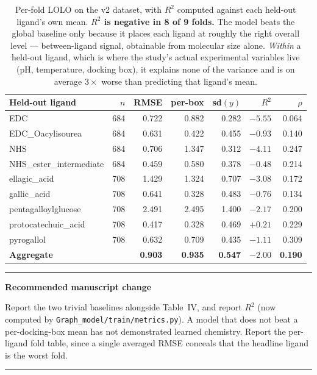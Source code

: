 \documentclass[11pt,a4paper]{article}
\newcommand{\ok}[1]{\textcolor{okgreen}{#1}}
\newcommand{\bad}[1]{\textcolor{badred}{#1}}
\newcommand{\code}[1]{\texttt{\small #1}}
\newenvironment{callout}[1]{%
  \par\medskip\noindent
  \begin{minipage}{\linewidth}%
  \rule{\linewidth}{1.2pt}\par\smallskip
  \textbf{#1}\par\smallskip
}{%
  \par\smallskip\rule{\linewidth}{0.6pt}%
  \end{minipage}\par\medskip
}
\begin{document}
\begin{table}[h]\centering
\small
\begin{tabular}{@{}lrrrrrr@{}}
\toprule
\textbf{Held-out ligand} & \textbf{$n$} & \textbf{RMSE} &
\textbf{per-box} & \textbf{sd$(y)$} & \textbf{$R^2$} & \textbf{$\rho$} \\
\midrule
EDC                     & 684 & 0.722 & 0.882 & 0.282 & \bad{$-5.55$} & 0.064 \\
EDC\_Oacylisourea       & 684 & 0.631 & 0.422 & 0.455 & \bad{$-0.93$} & 0.140 \\
NHS                     & 684 & 0.706 & 1.347 & 0.312 & \bad{$-4.11$} & 0.247 \\
NHS\_ester\_intermediate& 684 & 0.459 & 0.580 & 0.378 & \bad{$-0.48$} & 0.214 \\
ellagic\_acid           & 708 & 1.429 & 1.324 & 0.707 & \bad{$-3.08$} & 0.172 \\
gallic\_acid            & 708 & 0.641 & 0.328 & 0.483 & \bad{$-0.76$} & 0.134 \\
pentagalloylglucose     & 708 & 2.491 & 2.495 & 1.400 & \bad{$-2.17$} & 0.200 \\
protocatechuic\_acid    & 708 & 0.417 & 0.328 & 0.469 & \ok{$+0.21$}  & 0.229 \\
pyrogallol              & 708 & 0.632 & 0.709 & 0.435 & \bad{$-1.11$} & 0.309 \\
\midrule
\textbf{Aggregate}      &     & \textbf{0.903} & \textbf{0.935} &
  \textbf{0.547} & \bad{\textbf{$-2.00$}} & \textbf{0.190} \\
\bottomrule
\end{tabular}
\caption{Per-fold LOLO on the v2 dataset, with $R^2$ computed against each
held-out ligand's own mean. \textbf{$R^2$ is negative in 8 of 9 folds.} The
model beats the global baseline only because it places each ligand at roughly
the right overall level --- between-ligand signal, obtainable from molecular
size alone. \emph{Within} a held-out ligand, which is where the study's actual
experimental variables live (pH, temperature, docking box), it explains none
of the variance and is on average $3\times$ worse than predicting that
ligand's mean.}
\end{table}

\begin{callout}{Recommended manuscript change}
Report the two trivial baselines alongside Table~IV, and report $R^2$
(now computed by \code{Graph\_model/train/metrics.py}).
A model that does not beat a per-docking-box mean has not demonstrated
learned chemistry. Report the per-ligand fold table, since a single
averaged RMSE conceals that the headline ligand is the worst fold.
\end{callout}
\end{document}
